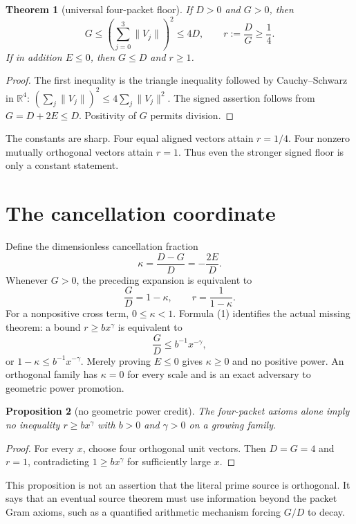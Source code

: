 \documentclass[11pt]{article}
\newcommand{\kappaC}{\kappa}
\newtheorem{theorem}{Theorem}
\newtheorem{proposition}[theorem]{Proposition}
\begin{document}
\begin{theorem}[universal four-packet floor]
If $D>0$ and $G>0$, then
\[
 G\leq \left(\sum_{j=0}^3\|V_j\|\right)^2\leq 4D,
 \qquad r:=\frac{D}{G}\geq\frac14.
\]
If in addition $E\leq0$, then $G\leq D$ and $r\geq1$.
\end{theorem}

\begin{proof}
The first inequality is the triangle inequality followed by
Cauchy--Schwarz in $\mathbb R^4$:
$(\sum_j\|V_j\|)^2\leq4\sum_j\|V_j\|^2$.  The signed assertion follows
from $G=D+2E\leq D$.  Positivity of $G$ permits division.
\end{proof}

The constants are sharp.  Four equal aligned vectors attain $r=1/4$.
Four nonzero mutually orthogonal vectors attain $r=1$.  Thus even the
stronger signed floor is only a constant statement.

\section{The cancellation coordinate}

Define the dimensionless cancellation fraction
\[
 \kappaC=\frac{D-G}{D}=-\frac{2E}{D}.
\]
Whenever $G>0$, the preceding expansion is equivalent to
\[
 \frac GD=1-\kappaC,\qquad
 r=\frac1{1-\kappaC}.
 \tag{1}
\]
For a nonpositive cross term, $0\leq\kappaC<1$.  Formula (1) identifies
the actual missing theorem: a bound $r\geq b x^\gamma$ is equivalent to
\[
 \frac GD\leq b^{-1}x^{-\gamma},
 \tag{2}
\]
or $1-\kappaC\leq b^{-1}x^{-\gamma}$.  Merely proving $E\leq0$ gives
$\kappaC\geq0$ and no positive power.  An orthogonal family has
$\kappaC=0$ for every scale and is an exact adversary to geometric power
promotion.

\begin{proposition}[no geometric power credit]
The four-packet axioms alone imply no inequality
$r\geq b x^\gamma$ with $b>0$ and $\gamma>0$ on a growing family.
\end{proposition}

\begin{proof}
For every $x$, choose four orthogonal unit vectors.  Then $D=G=4$ and
$r=1$, contradicting $1\geq b x^\gamma$ for sufficiently large $x$.
\end{proof}

This proposition is not an assertion that the literal prime source is
orthogonal.  It says that an eventual source theorem must use information
beyond the packet Gram axioms, such as a quantified arithmetic mechanism
forcing $G/D$ to decay.
\end{document}
